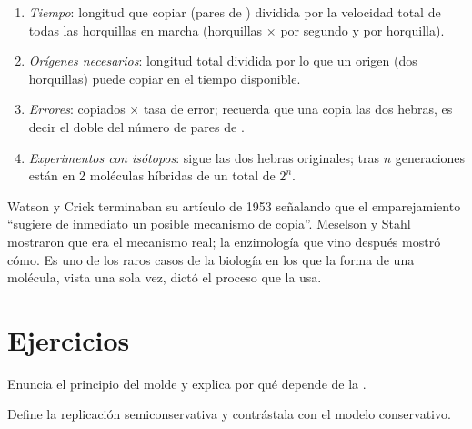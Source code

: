 \begin{method}\label{met:g11:dna-replication:calc}
\begin{enumerate}
  \item \emph{Tiempo}: longitud que copiar (pares de ) dividida
        por la velocidad total de todas las horquillas en marcha
        (horquillas $\times$  por segundo y por horquilla).
  \item \emph{Orígenes necesarios}: longitud total dividida por lo que
        un origen (dos horquillas) puede copiar en el tiempo
        disponible.
  \item \emph{Errores}:  copiados $\times$ tasa de error;
        recuerda que una  copia las dos hebras, es decir el doble
        del número de pares de .
  \item \emph{Experimentos con isótopos}: sigue las dos hebras
        originales; tras $n$ generaciones están en 2 moléculas híbridas
        de un total de $2^n$.
\end{enumerate}
\end{method}

\begin{remark}\label{rem:g11:dna-replication:fit}
Watson y Crick terminaban su artículo de 1953 señalando que el
emparejamiento ``sugiere de inmediato un posible mecanismo de copia''.
Meselson y Stahl mostraron que era el mecanismo real; la enzimología
que vino después mostró cómo. Es uno de los raros casos de la biología
en los que la forma de una molécula, vista una sola vez, dictó el
proceso que la usa.
\end{remark}

\section{Ejercicios}

\begin{exercise}[$\star$]\label{exo:g11:dna-replication:1}
Enuncia el principio del molde y explica por qué depende de la
.
\end{exercise}

\begin{exercise}[$\star$]\label{exo:g11:dna-replication:2}
Define la replicación semiconservativa y contrástala con el modelo
conservativo.
\end{exercise}

